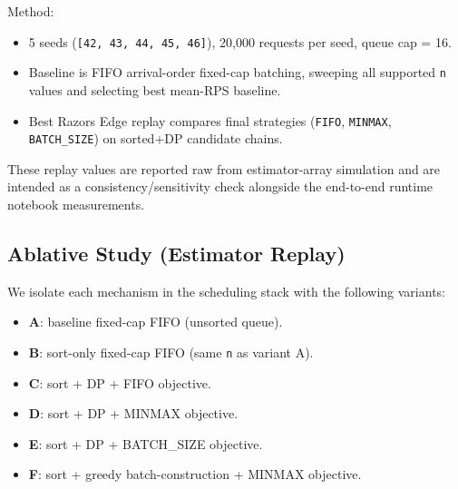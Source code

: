 \documentclass{article}
\providecommand{\tightlist}{\setlength{\itemsep}{0pt}\setlength{\parskip}{0pt}}
\begin{document}
Method:

\begin{itemize}
\tightlist
\item
  5 seeds (\texttt{{[}42,\ 43,\ 44,\ 45,\ 46{]}}), 20,000 requests per
  seed, queue cap = 16.
\item
  Baseline is FIFO arrival-order fixed-cap batching, sweeping all
  supported \texttt{n} values and selecting best mean-RPS baseline.
\item
  Best Razor\textquotesingle s Edge replay compares final strategies
  (\texttt{FIFO}, \texttt{MINMAX}, \texttt{BATCH\_SIZE}) on sorted+DP
  candidate chains.
\end{itemize}

\begin{table}[t]
\centering
{}
\end{table}

These replay values are reported raw from estimator-array simulation and
are intended as a consistency/sensitivity check alongside the end-to-end
runtime notebook measurements.

\hypertarget{722-ablative-study-estimator-replay}{%
\subsection{Ablative Study (Estimator
Replay)}\label{722-ablative-study-estimator-replay}}

We isolate each mechanism in the scheduling stack with the following
variants:

\begin{itemize}
\tightlist
\item
  \textbf{A}: baseline fixed-cap FIFO (unsorted queue).
\item
  \textbf{B}: sort-only fixed-cap FIFO (same \texttt{n} as variant A).
\item
  \textbf{C}: sort + DP + FIFO objective.
\item
  \textbf{D}: sort + DP + MINMAX objective.
\item
  \textbf{E}: sort + DP + BATCH\_SIZE objective.
\item
  \textbf{F}: sort + greedy batch-construction + MINMAX objective.
\end{itemize}
\end{document}
